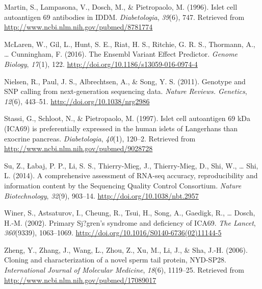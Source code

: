 \documentclass[12pt,twoside]{reedthesis}
\theoremstyle{definition}
\theoremstyle{definition}
\theoremstyle{remark}
\begin{document}
  \hypertarget{ref-Martin1996}{}
  Martin, S., Lampasona, V., Dosch, M., \& Pietropaolo, M. (1996). Islet
  cell autoantigen 69 antibodies in IDDM. \emph{Diabetologia},
  \emph{39}(6), 747. Retrieved from
  \url{http://www.ncbi.nlm.nih.gov/pubmed/8781774}
  
  \hypertarget{ref-McLaren2016}{}
  McLaren, W., Gil, L., Hunt, S. E., Riat, H. S., Ritchie, G. R. S.,
  Thormann, A., \ldots{} Cunningham, F. (2016). The Ensembl Variant Effect
  Predictor. \emph{Genome Biology}, \emph{17}(1), 122.
  \url{http://doi.org/10.1186/s13059-016-0974-4}
  
  \hypertarget{ref-Nielsen2011}{}
  Nielsen, R., Paul, J. S., Albrechtsen, A., \& Song, Y. S. (2011).
  Genotype and SNP calling from next-generation sequencing data.
  \emph{Nature Reviews. Genetics}, \emph{12}(6), 443--51.
  \url{http://doi.org/10.1038/nrg2986}
  
  \hypertarget{ref-Stassi1997}{}
  Stassi, G., Schloot, N., \& Pietropaolo, M. (1997). Islet cell
  autoantigen 69 kDa (ICA69) is preferentially expressed in the human
  islets of Langerhans than exocrine pancreas. \emph{Diabetologia},
  \emph{40}(1), 120--2. Retrieved from
  \url{http://www.ncbi.nlm.nih.gov/pubmed/9028728}
  
  \hypertarget{ref-Su2014}{}
  Su, Z., Łabaj, P. P., Li, S. S., Thierry-Mieg, J., Thierry-Mieg, D.,
  Shi, W., \ldots{} Shi, L. (2014). A comprehensive assessment of RNA-seq
  accuracy, reproducibility and information content by the Sequencing
  Quality Control Consortium. \emph{Nature Biotechnology}, \emph{32}(9),
  903--14. \url{http://doi.org/10.1038/nbt.2957}
  
  \hypertarget{ref-Winer2002}{}
  Winer, S., Astsaturov, I., Cheung, R., Tsui, H., Song, A., Gaedigk, R.,
  \ldots{} Dosch, H.-M. (2002). Primary Sj?gren's syndrome and deficiency
  of ICA69. \emph{The Lancet}, \emph{360}(9339), 1063--1069.
  \url{http://doi.org/10.1016/S0140-6736(02)11144-5}
  
  \hypertarget{ref-Zheng2006}{}
  Zheng, Y., Zhang, J., Wang, L., Zhou, Z., Xu, M., Li, J., \& Sha, J.-H.
  (2006). Cloning and characterization of a novel sperm tail protein,
  NYD-SP28. \emph{International Journal of Molecular Medicine},
  \emph{18}(6), 1119--25. Retrieved from
  \url{http://www.ncbi.nlm.nih.gov/pubmed/17089017}


\end{document}
